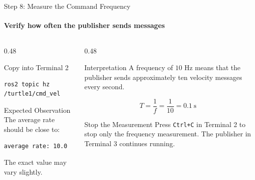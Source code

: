 \begin{frame}[fragile]{Step 8: Measure the Command Frequency}
\framesubtitle{Verify how often the publisher sends messages}

\footnotesize

\begin{columns}[T,onlytextwidth]

    \begin{column}{0.48\textwidth}
        \begin{block}{Copy into Terminal 2}
\begin{verbatim}
ros2 topic hz /turtle1/cmd_vel
\end{verbatim}
        \end{block}

        \begin{exampleblock}{Expected Observation}
            The average rate should be close to:

\begin{verbatim}
average rate: 10.0
\end{verbatim}

            The exact value may vary slightly.
        \end{exampleblock}
    \end{column}

    \begin{column}{0.48\textwidth}
        \begin{block}{Interpretation}
            A frequency of \(10\) Hz means that the publisher sends approximately
            ten velocity messages every second.

            \[
            T = \frac{1}{f}
              = \frac{1}{10}
              = 0.1~\text{s}
            \]
        \end{block}

        \vspace{0.15cm}

        \begin{alertblock}{Stop the Measurement}
            Press \texttt{Ctrl+C} in Terminal 2 to stop only the frequency
            measurement. The publisher in Terminal 3 continues running.
        \end{alertblock}
    \end{column}

\end{columns}

\end{frame}

